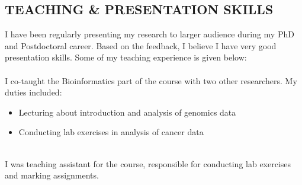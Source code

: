 \documentclass[margin, 10pt]{res} %
\begin{document}
\begin{resume}

\section{TEACHING \& PRESENTATION SKILLS}
I have been regularly presenting my research to larger audience during my PhD and Postdoctoral career. Based on the feedback, I believe I have very good presentation skills. Some of my teaching experience is given below: \\

{\bf \color{Brown}{Molecular Oncology and Biostatistics, 2017}} \\
I co-taught the Bioinformatics part of the course with two other researchers. My duties included: 
\begin{itemize} 
\item Lecturing about introduction and analysis of genomics data 
\item Conducting lab exercises in analysis of cancer data
\end{itemize} 
{\bf \color{Brown}{Advanced Software Engineering, 2008}} \\
I was teaching assistant for the course, responsible for conducting lab exercises and marking assignments.



\end{resume}
\end{document}
